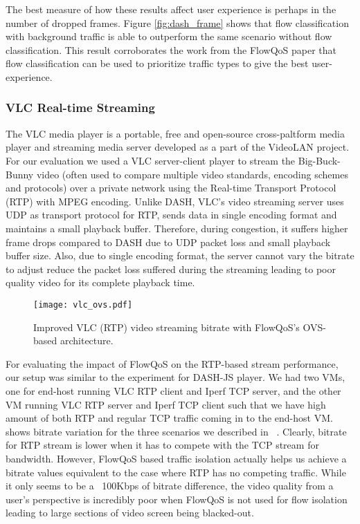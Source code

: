 The best measure of how these results affect user experience is perhaps in the number of dropped frames. Figure \ref{fig:dash_frame} shows that flow classification with background traffic is able to outperform the same scenario without flow classification. This result corroborates the work from the FlowQoS paper that flow classification can be used to prioritize traffic types to give the best user-experience.

\subsubsection{VLC Real-time Streaming}
\label{sec:evaluation:vlc-rtp-streaming}
The VLC media player \cite{vlc} is a portable, free and open-source cross-paltform media player and streaming media server developed as a part of the VideoLAN \cite{vlc} project. For our evaluation we used a VLC server-client player to stream the Big-Buck-Bunny video (often used to compare multiple video standards, encoding schemes and protocols) over a private network using the Real-time Transport Protocol (RTP) \cite{rtp} with MPEG encoding. Unlike DASH, VLC's video streaming server uses UDP as transport protocol for RTP, sends data in single encoding format and maintains a small playback buffer. Therefore, during congestion, it suffers higher frame drops compared to DASH due to UDP packet loss and small playback buffer size. Also, due to single encoding format, the server cannot vary the bitrate to adjust reduce the packet loss suffered during the streaming leading to poor quality video for its complete playback time.

\begin{figure}[t]
    \texttt{[image: vlc\_ovs.pdf]}
    \caption{Improved VLC (RTP) video streaming bitrate with FlowQoS's OVS-based architecture.}
    \centering
    \label{fig:vlc_ovs}
\end{figure}

For evaluating the impact of FlowQoS on the RTP-based stream performance, our setup was similar to the experiment for DASH-JS player. We had two VMs, one for end-host running VLC RTP client and Iperf TCP server, and the other VM running VLC RTP server and Iperf TCP client such that we have high amount of both RTP and regular TCP traffic coming in to the end-host VM. ~ shows bitrate variation for the three scenarios we described in ~.
Clearly, bitrate for RTP stream is lower when it has to compete with the TCP stream for bandwidth. However, FlowQoS based traffic isolation actually helps us achieve a bitrate values equivalent to the case where RTP has no competing traffic. While it only seems to be a ~100Kbps of bitrate difference, the video quality from a user's perspective is incredibly poor when FlowQoS is not used for flow isolation leading to large sections of video screen being blacked-out.


